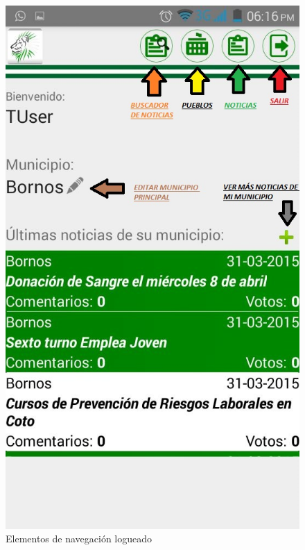 \begin{figure}
\centering
\includegraphics[scale=0.5]{./android/imagenes/botones2.jpg}
\caption{Elementos de navegación logueado}
\label{boton2}
\end{figure}

